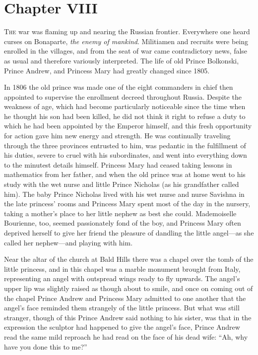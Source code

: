 \chapter*{Chapter VIII}

\lettrine[lines=2, loversize=0.3, lraise=0]{\initfamily T}{he}
war was flaming up and nearing the Russian
frontier. Everywhere one heard curses on Bonaparte, \emph{the enemy
of mankind}. Militiamen and recruits were being enrolled in the
villages, and from the seat of war came contradictory news, false
as usual and therefore variously interpreted. The life of old
Prince Bolkonski, Prince Andrew, and Princess Mary had greatly
changed since 1805.

In 1806 the old prince was made one of the eight commanders in
chief then appointed to supervise the enrollment decreed
throughout Russia.  Despite the weakness of age, which had become
particularly noticeable since the time when he thought his son
had been killed, he did not think it right to refuse a duty to
which he had been appointed by the Emperor himself, and this
fresh opportunity for action gave him new energy and strength. He
was continually traveling through the three provinces entrusted
to him, was pedantic in the fulfillment of his duties, severe to
cruel with his subordinates, and went into everything down to the
minutest details himself. Princess Mary had ceased taking lessons
in mathematics from her father, and when the old prince was at
home went to his study with the wet nurse and little Prince
Nicholas (as his grandfather called him). The baby Prince
Nicholas lived with his wet nurse and nurse Savishna in the late
princess' rooms and Princess Mary spent most of the day in the
nursery, taking a mother's place to her little nephew as best she
could. Mademoiselle Bourienne, too, seemed passionately fond of
the boy, and Princess Mary often deprived herself to give her
friend the pleasure of dandling the little angel---as she called
her nephew---and playing with him.

Near the altar of the church at Bald Hills there was a chapel
over the tomb of the little princess, and in this chapel was a
marble monument brought from Italy, representing an angel with
outspread wings ready to fly upwards. The angel's upper lip was
slightly raised as though about to smile, and once on coming out
of the chapel Prince Andrew and Princess Mary admitted to one
another that the angel's face reminded them strangely of the
little princess. But what was still stranger, though of this
Prince Andrew said nothing to his sister, was that in the
expression the sculptor had happened to give the angel's face,
Prince Andrew read the same mild reproach he had read on the face
of his dead wife: ``Ah, why have you done this to me?''

